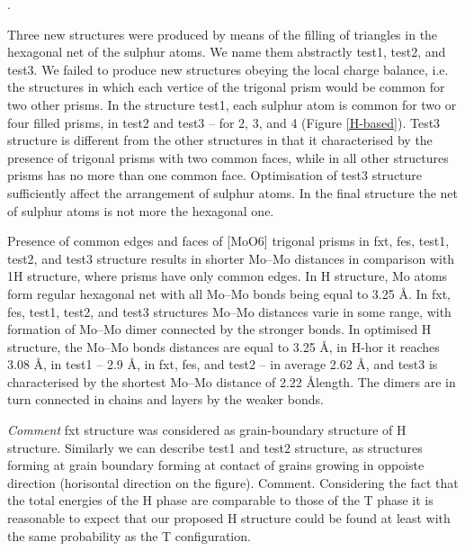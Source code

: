 .\documentclass[a4paperm]{article}
\begin{document}
Three new structures were produced by means of the filling of triangles in the hexagonal net of the sulphur atoms.
We name them abstractly test1, test2, and test3.
We failed to produce new structures obeying the local charge balance, i.e. the structures in which each vertice of the trigonal prism would be common for two other prisms.
In the structure test1, each sulphur atom is common for two or four filled prisms, in test2 and test3 – for 2, 3, and 4 (Figure \ref{H-based}).
Test3 structure is different from the other structures in that it characterised by the presence of trigonal prisms with two common faces, while in all other structures prisms has no more than one common face.
Optimisation of test3 structure sufficiently affect the arrangement of sulphur atoms.
In the final structure the net of sulphur atoms is not more the hexagonal one.

Presence of common edges and faces of [MoO6] trigonal prisms in fxt, fes, test1, test2, and test3 structure results in shorter Mo--Mo distances in comparison with 1H structure, where prisms have only common edges.
In H structure, Mo atoms form regular hexagonal net with all Mo--Mo bonds being equal to 3.25 \AA.
In fxt, fes, test1, test2, and test3 structures Mo--Mo distances varie in some range, with formation of Mo--Mo dimer connected by the stronger bonds.
In optimised H structure, the Mo--Mo bonds distances are equal to 3.25 \AA, in H-hor it reaches 3.08 \AA, in test1 -- 2.9 \AA, in fxt, fes, and test2 -- in average 2.62 \AA, and test3 is characterised by the shortest Mo--Mo distance of 2.22 \AA length. 
The dimers are in turn connected in chains and layers by the weaker bonds.

{\it Comment}
 fxt structure was considered as grain-boundary structure of H structure. Similarly we can describe test1 and test2 structure, as structures forming at grain boundary forming at contact of grains growing in oppoiste direction (horisontal direction on the figure).
Comment. Considering the fact that the total energies of the H phase are comparable to those of the T phase it is reasonable to expect that our proposed H structure could be found at least with the same probability as the T configuration.
\end{document}
